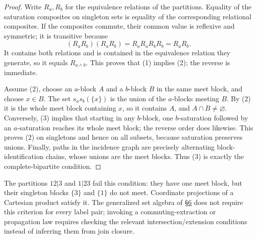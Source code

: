 \begin{proof}

Write \(R_a,R_b\) for the equivalence relations of the partitions. Equality of the saturation composites on singleton sets is equality of the corresponding relational composites. If the composites commute, their common value is reflexive and symmetric; it is transitive because
\[
(R_aR_b)(R_aR_b)=R_aR_aR_bR_b=R_aR_b.
\]
It contains both relations and is contained in the equivalence relation they generate, so it equals \(R_{a\wedge b}\). This proves that (1) implies (2); the reverse is immediate.

Assume (2), choose an \(a\)-block \(A\) and a \(b\)-block \(B\) in the same meet block, and choose \(x\in B\). The set \(s_a s_b(\{x\})\) is the union of the \(a\)-blocks meeting \(B\). By (2) it is the whole meet block containing \(x\), so it contains \(A\), and \(A\cap B\ne\varnothing\). Conversely, (3) implies that starting in any \(b\)-block, one \(b\)-saturation followed by an \(a\)-saturation reaches its whole meet block; the reverse order does likewise. This proves (2) on singletons and hence on all subsets, because saturation preserves unions. Finally, paths in the incidence graph are precisely alternating block-identification chains, whose unions are the meet blocks. Thus (3) is exactly the complete-bipartite condition.
\end{proof}

The partitions \(12|3\) and \(1|23\) fail this condition: they have one meet block, but their singleton blocks \(\{3\}\) and \(\{1\}\) do not meet. Coordinate projections of a Cartesian product satisfy it. The generalized set algebra of \hyperlink{sec:6}{§6} does not require this criterion for every label pair; invoking a commuting-extraction or propagation law requires checking the relevant intersection/extension conditions instead of inferring them from join closure.
